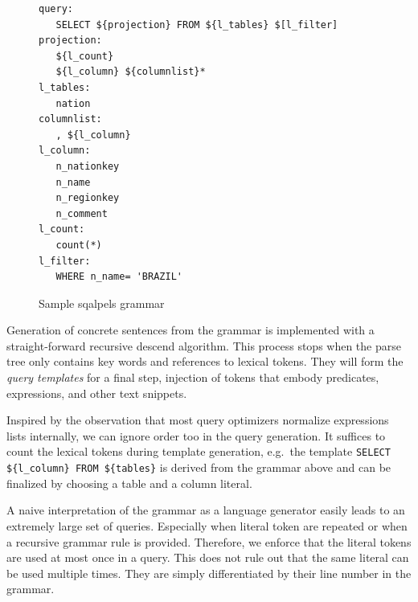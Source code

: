 \documentclass{cidr-2019}
\begin{document}
\begin{figure}[t]
\begin{verbatim}
query:
   SELECT ${projection} FROM ${l_tables} $[l_filter]
projection:
   ${l_count}
   ${l_column} ${columnlist}*
l_tables:
   nation
columnlist:
   , ${l_column}
l_column: 
   n_nationkey
   n_name
   n_regionkey
   n_comment
l_count: 
   count(*)
l_filter: 
   WHERE n_name= 'BRAZIL'
\end{verbatim}
	\caption{Sample {\sc sqalpels} grammar \label{fig:script1}}
\end{figure}

Generation of concrete sentences from the grammar is implemented with
a straight-forward recursive descend algorithm. This process stops
when the parse tree only contains key words and references to lexical
tokens. They will form the \emph{ query templates} for a final step,
injection of tokens that embody predicates, expressions, and other
text snippets.

Inspired by the observation that most query optimizers normalize
expressions lists internally, we can ignore order too in the query
generation. It suffices to count the lexical tokens during template
generation, e.g.\ the template \verb~SELECT ${l_column} FROM ${tables}~
is derived from the grammar above and can be finalized by choosing a
table and a column literal.

A naive interpretation of the grammar as a language generator easily
leads to an extremely large set of queries. Especially when literal
token are repeated or when a recursive grammar rule is provided.
Therefore, we enforce that the literal tokens are used at most once in
a query. This does not rule out that the same literal can be used
multiple times. They are simply differentiated by their line number in the
grammar.



\end{document}
